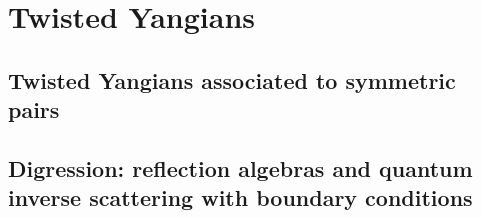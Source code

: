 \section{Twisted Yangians}
    \subsection{Twisted Yangians associated to symmetric pairs}

    \subsection{Digression: reflection algebras and quantum inverse scattering with boundary conditions}